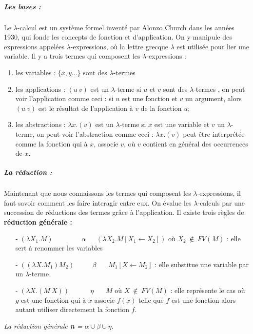 \documentclass[10pt,a4paper]{article}
\begin{document}
				\subparagraph{Les bases :}
				Le $\lambda$-calcul est un système formel inventé par Alonzo Church dans les années 1930, qui fonde les concepts de fonction et d'application. On y manipule des expressions appelées $\lambda$-expressions, où la lettre grecque $\lambda$ est utilisée pour lier une variable. Il y a trois termes qui composent les $\lambda$-expressions :
				\begin{enumerate}
					\item les variables : $\{x, y...\}$ sont des $\lambda$-termes 
					\item les applications : $(u~v)$ est un $\lambda$-terme si $u$ et $v$ sont des $\lambda$-termes , on peut voir l'application comme ceci : si $u$ est une fonction et $v$ un argument, alors $(u~v)$ est le résultat de l'application à $v$ de la fonction $u$; 
					\item les abstractions : $\lambda x.(v)$ est un $\lambda$-terme si $x$ est une variable et $v$ un $\lambda$-terme, on peut voir l'abstraction comme ceci : $\lambda x.(v)$ peut être interprétée comme la fonction qui à $x$, associe $v$, où $v$ contient en général des occurrences de $x$.
				\end{enumerate}
				\bigbreak
				
				
				\subparagraph{La réduction :}Maintenant que nous connaissons les termes qui composent les $\lambda$-expressions, il faut savoir comment les faire interagir entre eux. On évalue les $\lambda$-calculs par une succession de réductions des termes grâce à l'application. Il existe trois règles de \textbf{réduction générale :}
				\begin{itemize}
					\item[-] $(\lambda X_{1}.M)~~~~~~~~~~~~~~~~~~~\alpha~~~~~~~(\lambda X_{2}.M[X_{1} \leftarrow X_{2}])$
					où $X_{2}~\notin~FV(M)$ : elle sert à renommer les variables
					\item[-] $((\lambda X.M_{1})M_{2})~~~~~~~~~~~~\beta~~~~~~~~M_{1}[X \leftarrow M_{2}]$ : elle substitue une variable par un $\lambda$-terme
    				\item[-] $(\lambda X.(M~X))~~~~~~~~~~~~~~\eta~~~~~~~~M$ 
					où $X~\notin~FV(M)$ : elle représente le cas où $g$ est une fonction qui à $x$ associe $f(x)$  telle que $f$ est une fonction alors autant utiliser directement la fonction $f$.
				\end{itemize}
				\medbreak
				
				\textit{La réduction générale \textbf{n} = $\alpha \cup \beta \cup \eta$}.
				\bigbreak
				
\end{document}

